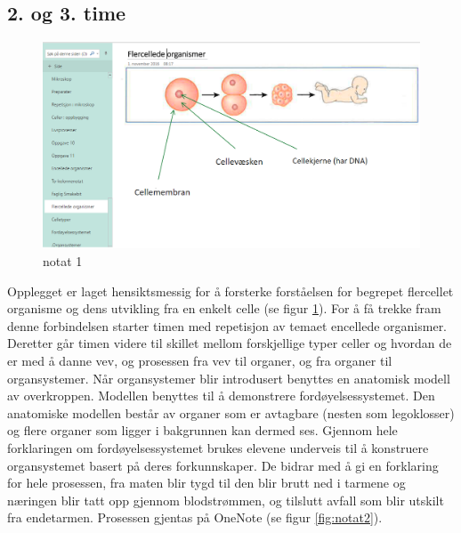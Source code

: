 \documentclass[main.tex]{subfiles}
\begin{document}
\subsection*{2. og 3. time}

\begin{figure}[h!]
\includegraphics[scale = 0.6]{../figures/onenote_flercellet.png}
\caption{notat 1}
\label{fig:notat1}
\end{figure}

\hspace{-6mm}Opplegget er laget hensiktsmessig for å forsterke forståelsen for begrepet flercellet organisme og dens utvikling fra 
en enkelt celle (se figur \ref{fig:notat1}). For å få trekke fram denne forbindelsen starter timen med repetisjon av temaet encellede organismer. 
Deretter går timen videre til skillet mellom forskjellige typer celler og hvordan de er med å danne vev, og prosessen fra vev til
organer, og fra organer til organsystemer. Når organsystemer blir introdusert benyttes 
en anatomisk modell av overkroppen. Modellen benyttes til å demonstrere fordøyelsessystemet.
Den anatomiske modellen består av organer som er avtagbare (nesten som legoklosser) og flere organer 
som ligger i bakgrunnen kan dermed ses. Gjennom hele forklaringen om fordøyelsessystemet brukes
elevene underveis til å konstruere organsystemet basert på deres forkunnskaper. 
De bidrar med å gi en forklaring for hele prosessen, fra maten blir tygd til den blir brutt ned i tarmene 
og næringen blir tatt opp gjennom blodstrømmen, og tilslutt avfall som blir utskilt fra endetarmen. 
Prosessen gjentas på OneNote (se figur \ref{fig:notat2}). 
\end{document}
